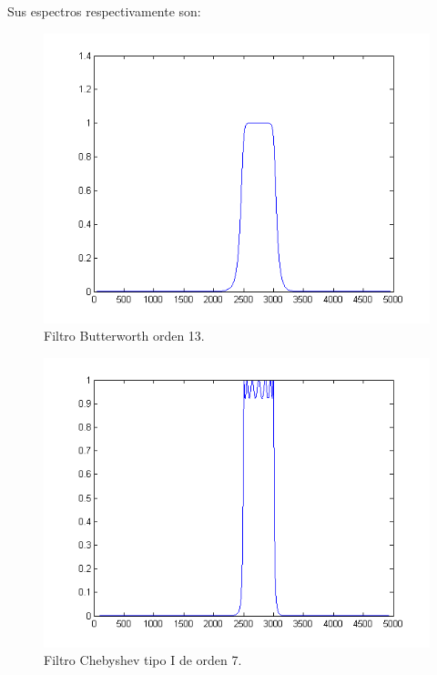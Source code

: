 \documentclass[10pt,a4paper,final]{article}
\begin{document}
Sus espectros respectivamente son:
\begin{figure}[h!]
\centering
  \caption{Filtro Butterworth orden 13.}
  \label{fig:res120}
  \includegraphics[scale=0.5]{fig12.png}
    
\end{figure}

\begin{figure}[h!]
\centering
  \caption{Filtro Chebyshev tipo I de orden 7.}
  \label{fig:res120}
  \includegraphics[scale=0.5]{fig13.png}
    
\end{figure}
\end{document}
